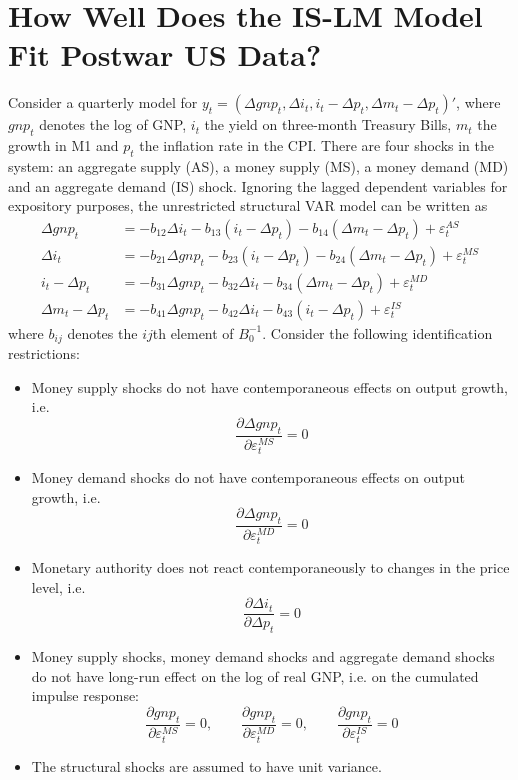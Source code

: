 \documentclass{article}
\begin{document}
\section{How Well Does the IS-LM Model Fit Postwar US Data?}
Consider a quarterly model for $y_t = (\Delta gnp_t, \Delta i_t, i_t-\Delta p_t, \Delta m_t - \Delta p_t)'$, where $gnp_t$ denotes the log of GNP, $i_t$ the yield on three-month Treasury Bills, $m_t$ the growth in M1 and $p_t$ the inflation rate in the CPI. There are four shocks in the system: an aggregate supply (AS), a money supply (MS), a money demand (MD) and an aggregate demand (IS) shock. Ignoring the lagged dependent variables for expository purposes, the unrestricted structural VAR model can be written as  
\begin{align*}
\Delta gnp_t &= -b_{12}\Delta i_t -b_{13}(i_t-\Delta p_t) -b_{14}(\Delta m_t-\Delta p_t) + \varepsilon_t^{AS}\\
\Delta i_t &= -b_{21}\Delta gnp_t -b_{23}(i_t-\Delta p_t) -b_{24}(\Delta m_t-\Delta p_t) + \varepsilon_t^{MS}\\
i_t - \Delta p_t &= -b_{31}\Delta gnp_t -b_{32}\Delta i_t -b_{34}(\Delta m_t-\Delta p_t) + \varepsilon_t^{MD}\\
\Delta m_t - \Delta p_t &= -b_{41}\Delta gnp_t -b_{42}\Delta i_t - b_{43} (i_t-\Delta p_t) + \varepsilon_t^{IS}
\end{align*}
where $b_{ij}$ denotes the $ij$th element of $B_0^{-1}$. Consider the following identification restrictions:
\begin{itemize}
	\item Money supply shocks do not have contemporaneous effects on output growth, i.e. $$\frac{\partial \Delta gnp_t}{\partial \varepsilon_t^{MS}}=0$$
	\item Money demand shocks do not have contemporaneous effects on output growth, i.e. $$\frac{\partial \Delta gnp_t}{\partial \varepsilon_t^{MD}}=0$$
	\item Monetary authority does not react contemporaneously to changes in the price level, i.e. $$\frac{\partial \Delta i_t}{\partial \Delta p_t}=0$$
	\item Money supply shocks, money demand shocks and aggregate demand shocks do not have long-run effect on the log of real GNP, i.e. on the cumulated impulse response:
	$$\frac{\partial gnp_t}{\partial \varepsilon_t^{MS}}=0,\qquad \frac{\partial gnp_t}{\partial \varepsilon_t^{MD}}=0,\qquad \frac{\partial gnp_t}{\partial \varepsilon_t^{IS}}=0$$
	\item The structural shocks are assumed to have unit variance.
\end{itemize}
\end{document}
